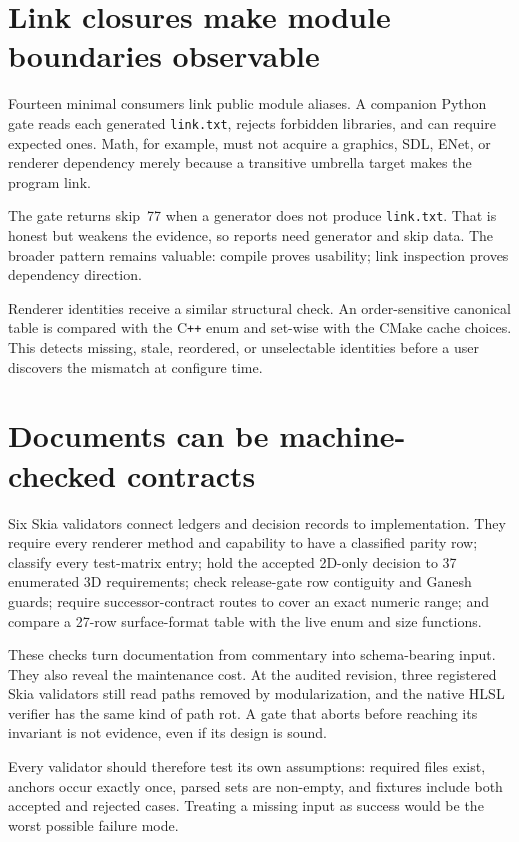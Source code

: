 \section{Link closures make module boundaries observable}

Fourteen minimal consumers link public module aliases.  A companion Python gate reads each
generated \texttt{link.txt}, rejects forbidden libraries, and can require expected ones.  Math,
for example, must not acquire a graphics, SDL, ENet, or renderer dependency merely because a
transitive umbrella target makes the program link.

The gate returns skip~77 when a generator does not produce \texttt{link.txt}.  That is honest
but weakens the evidence, so reports need generator and skip data.  The broader pattern remains
valuable: compile proves usability; link inspection proves dependency direction.

Renderer identities receive a similar structural check.  An order-sensitive canonical table is
compared with the C\texttt{++} enum and set-wise with the CMake cache choices.  This detects
missing, stale, reordered, or unselectable identities before a user discovers the mismatch at
configure time.

\section{Documents can be machine-checked contracts}

Six Skia validators connect ledgers and decision records to implementation.  They require every
renderer method and capability to have a classified parity row; classify every test-matrix entry;
hold the accepted 2D-only decision to 37 enumerated 3D requirements; check release-gate row
contiguity and Ganesh guards; require successor-contract routes to cover an exact numeric range;
and compare a 27-row surface-format table with the live enum and size functions.

These checks turn documentation from commentary into schema-bearing input.  They also reveal the
maintenance cost.  At the audited revision, three registered Skia validators still read paths
removed by modularization, and the native HLSL verifier has the same kind of path rot.  A gate
that aborts before reaching its invariant is not evidence, even if its design is sound.

Every validator should therefore test its own assumptions: required files exist, anchors occur
exactly once, parsed sets are non-empty, and fixtures include both accepted and rejected cases.
Treating a missing input as success would be the worst possible failure mode.

